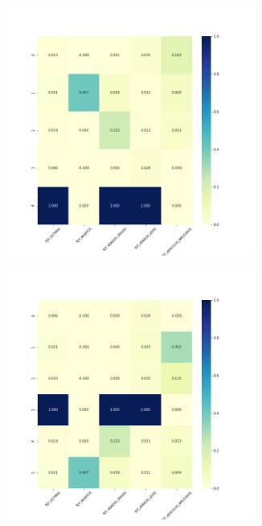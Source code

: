 \begin{figure}[H]
\begin{subfigure}{.5\textwidth}
\end{subfigure}
\begin{subfigure}{.5\textwidth}
  \centering
  \includegraphics[width=0.9\textwidth]{imagenes/case1/kmeans/heatmaps/hm_kmeans_case1_salida_k5.png}
\end{subfigure}
\begin{subfigure}{.5\textwidth}
  \centering
  \includegraphics[width=0.9\textwidth]{imagenes/case1/kmeans/heatmaps/hm_kmeans_case1_salida_k6.png}

\end{subfigure}
\end{figure}
